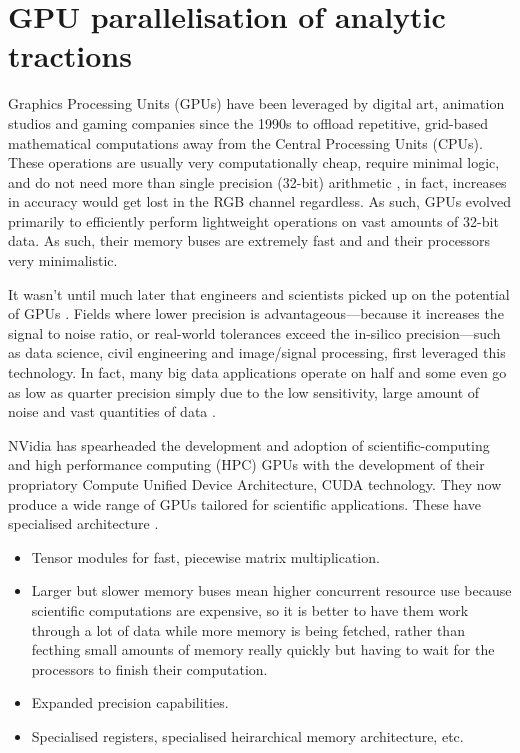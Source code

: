 \section{GPU parallelisation of analytic tractions}\label{s:parallel}

Graphics Processing Units (GPUs) have been leveraged by digital art, animation studios and gaming companies since the 1990s to offload repetitive, grid-based mathematical computations away from the Central Processing Units (CPUs). These operations are usually very computationally cheap, require minimal logic, and do not need more than single precision (32-bit) arithmetic \cite{gpu1,gpu2,gpu3}, in fact, increases in accuracy would get lost in the RGB channel regardless. As such, GPUs evolved primarily to efficiently perform lightweight operations on vast amounts of 32-bit data. As such, their memory buses are extremely fast and and their processors very minimalistic.

It wasn't until much later that engineers and scientists picked up on the potential of GPUs \cite{gpu_comp,mixedPrecFEM,jia2014gpu}. Fields where lower precision is advantageous---because it increases the signal to noise ratio, or real-world tolerances exceed the in-silico precision---such as data science, civil engineering and image/signal processing, first leveraged this technology. In fact, many big data applications operate on half and some even go as low as quarter precision simply due to the low sensitivity, large amount of noise and vast quantities of data \cite{pagerank}.

NVidia has spearheaded the development and adoption of scientific-computing and high performance computing (HPC) GPUs with the development of their propriatory Compute Unified Device Architecture, CUDA technology. They now produce a wide range of GPUs tailored for scientific applications. These have specialised architecture \cite{nvidia}.
\begin{itemize}
    \item Tensor modules for fast, piecewise matrix multiplication.
    \item Larger but slower memory buses mean higher concurrent resource use because scientific computations are expensive, so it is better to have them work through a lot of data while more memory is being fetched, rather than fecthing small amounts of memory really quickly but having to wait for the processors to finish their computation.
    \item Expanded precision capabilities.
    \item Specialised registers, specialised heirarchical memory architecture, etc.
\end{itemize}

